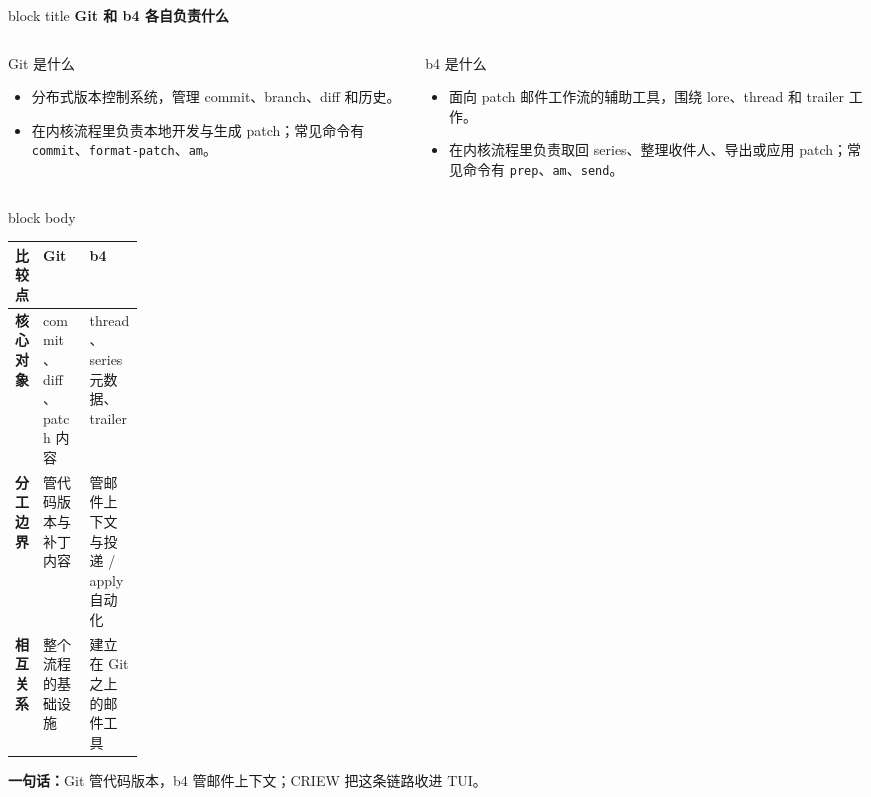 \documentclass[aspectratio=169,professionalfonts]{beamer}
\newcommand{\sectiontitle}[1]{
  \begin{beamercolorbox}[wd=\linewidth,sep=0.7em,rounded=true]{block title}
    \usebeamerfont*{frametitle}\Large\bfseries #1
  \end{beamercolorbox}
  \vspace{0.4em}
}
\begin{document}
\begin{frame}
  \sectiontitle{Git 和 b4 各自负责什么}
  \scriptsize
  \begin{columns}[T,totalwidth=\textwidth]
    \begin{column}{0.48\textwidth}
      \begin{exampleblock}{Git 是什么}
        \begin{itemize}
          \item 分布式版本控制系统，管理 commit、branch、diff 和历史。
          \item 在内核流程里负责本地开发与生成 patch；常见命令有 \texttt{commit}、\texttt{format-patch}、\texttt{am}。
        \end{itemize}
      \end{exampleblock}
    \end{column}
    \begin{column}{0.48\textwidth}
      \begin{alertblock}{b4 是什么}
        \begin{itemize}
          \item 面向 patch 邮件工作流的辅助工具，围绕 lore、thread 和 trailer 工作。
          \item 在内核流程里负责取回 series、整理收件人、导出或应用 patch；常见命令有 \texttt{prep}、\texttt{am}、\texttt{send}。
        \end{itemize}
      \end{alertblock}
    \end{column}
  \end{columns}
  \vspace{0.2em}
  \begin{beamercolorbox}[wd=\linewidth,sep=0.75em,rounded=true]{block body}
    {\setlength{\tabcolsep}{4pt}
    \begin{tabularx}{\linewidth}{>{\bfseries}p{0.15\linewidth} >{\raggedright\arraybackslash}X >{\raggedright\arraybackslash}X}
      \toprule
      比较点 & Git & b4 \\
      \midrule
      核心对象 & commit、diff、patch 内容 & thread、series 元数据、trailer \\
      分工边界 & 管代码版本与补丁内容 & 管邮件上下文与投递 / apply 自动化 \\
      相互关系 & 整个流程的基础设施 & 建立在 Git 之上的邮件工具 \\
      \bottomrule
    \end{tabularx}}
  \end{beamercolorbox}
  \vspace{0.2em}
  {\scriptsize \textbf{一句话：}Git 管代码版本，b4 管邮件上下文；CRIEW 把这条链路收进 TUI。}
\end{frame}
\end{document}
